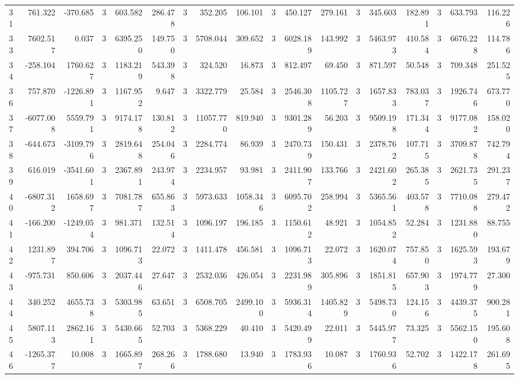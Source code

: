 \begin{table}[ht]
\begin{tabular}{lrrrrrrrrrrrrrrrrr}
31 & 761.322 & -370.685 & 3 & 603.582 & 286.478 & 3 & 352.205 & 106.101 & 3 & 450.127 & 279.161 & 3 & 345.603 & 182.891 & 3 & 633.793 & 116.226 \\
33 & 7602.517 & 0.037 & 3 & 6395.250 & 149.750 & 3 & 5708.044 & 309.652 & 3 & 6028.189 & 143.992 & 3 & 5463.973 & 410.584 & 3 & 6676.228 & 114.786 \\
34 & -258.104 & 1760.627 & 3 & 1183.219 & 543.398 & 3 & 324.520 & 16.873 & 3 & 812.497 & 69.450 & 3 & 871.597 & 50.548 & 3 & 709.348 & 251.525 \\
36 & 757.870 & -1226.891 & 3 & 1167.952 & 9.647 & 3 & 3322.779 & 25.584 & 3 & 2546.308 & 1105.727 & 3 & 1657.833 & 783.037 & 3 & 1926.746 & 673.770 \\
37 & -6077.008 & 5559.791 & 3 & 9174.178 & 130.812 & 3 & 11057.770 & 819.940 & 3 & 9301.289 & 56.203 & 3 & 9509.198 & 171.344 & 3 & 9177.082 & 158.020 \\
38 & -644.673 & -3109.796 & 3 & 2819.648 & 254.046 & 3 & 2284.774 & 86.939 & 3 & 2470.739 & 150.431 & 3 & 2378.762 & 107.715 & 3 & 3709.878 & 742.794 \\
39 & 616.019 & -3541.601 & 3 & 2367.891 & 243.974 & 3 & 2234.957 & 93.981 & 3 & 2411.907 & 133.766 & 3 & 2421.602 & 265.385 & 3 & 2621.735 & 291.237 \\
40 & -6807.312 & 1658.697 & 3 & 7081.787 & 655.863 & 3 & 5973.633 & 1058.346 & 3 & 6095.702 & 258.994 & 3 & 5365.561 & 403.578 & 3 & 7710.088 & 279.472 \\
41 & -166.200 & -1249.054 & 3 & 981.371 & 132.514 & 3 & 1096.197 & 196.185 & 3 & 1150.612 & 48.921 & 3 & 1054.852 & 52.284 & 3 & 1231.880 & 88.755 \\
42 & 1231.897 & 394.706 & 3 & 1096.713 & 22.072 & 3 & 1411.478 & 456.581 & 3 & 1096.713 & 22.072 & 3 & 1620.074 & 757.850 & 3 & 1625.593 & 193.679 \\
43 & -975.731 & 850.606 & 3 & 2037.446 & 27.647 & 3 & 2532.036 & 426.054 & 3 & 2231.989 & 305.896 & 3 & 1851.815 & 657.903 & 3 & 1974.779 & 27.300 \\
44 & 340.252 & 4655.738 & 3 & 5303.985 & 63.651 & 3 & 6508.705 & 2499.100 & 3 & 5936.314 & 1405.829 & 3 & 5498.730 & 124.156 & 3 & 4439.375 & 900.281 \\
45 & 5807.113 & 2862.161 & 3 & 5430.665 & 52.703 & 3 & 5368.229 & 40.410 & 3 & 5420.499 & 22.011 & 3 & 5445.977 & 73.325 & 3 & 5562.150 & 195.608 \\
46 & -1265.377 & 10.008 & 3 & 1665.897 & 268.266 & 3 & 1788.680 & 13.940 & 3 & 1783.936 & 10.087 & 3 & 1760.936 & 52.702 & 3 & 1422.178 & 261.695 \\

\end{tabular}
\end{table}
